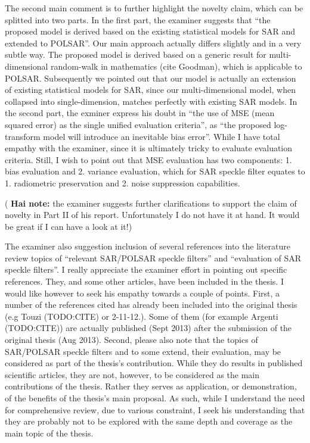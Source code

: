 \documentclass{article}
\begin{document}
The second main comment is to further highlight the novelty claim, which can be splitted into two parts.
In the first part, the examiner suggests that ``the proposed model is derived based on the existing statistical models for SAR and extended to POLSAR''.
Our main approach actually differs slightly and in a very subtle way.
The proposed model is derived based on a generic result for multi-dimensional random-walk in mathematics (cite Goodman), which is applicable to POLSAR.
Subsequently we pointed out that our model is actually an extension of existing statistical models for SAR,
  since our multi-dimensional model, when collapsed into single-dimension, matches perfectly with existing SAR models.
In the second part, the exminer express his doubt in ``the use of MSE (mean squared error) as the single unified evaluation criteria'',
  as ``the proposed log-transform model will introduce an inevitable bias error''.
While I have total empathy with the examiner, since it is ultimately tricky to evaluate evaluation criteria.
Still, I wish to point out that MSE evaluation has two components: 1. bias evaluation and 2. variance evaluation,
  which for SAR speckle filter equates to 1. radiometric preservation and 2. noise suppression capabilities.

( \textbf{ Hai note: }  the examiner suggests further clarifications to support the claim of novelty in Part II of his report.
Unfortunately I do not have it at hand.
It would be great if I can have a look at it!)

The examiner also suggestion inclusion of several references into the literature review topics of ``relevant SAR/POLSAR speckle filters'' and  ``evaluation of SAR speckle filters''.
I really appreciate the examiner effort in pointing out specific references.
They, and some other articles, have been included in the thesis.
I would like however to seek his empathy towards a couple of points.
First, a number of the references cited has already been included into the original thesis (e.g Touzi (TODO:CITE) or 2-11-12.). 
Some of them (for example Argenti (TODO:CITE)) are actually published (Sept 2013) after the submission of the original thesis (Aug 2013).
Second, please also note that the topics of SAR/POLSAR speckle filters and to some extend, their evaluation, may be considered as part of the thesis's contribution.
While they do results in published scientific articles, 
  they are not, however, to be considered as the main contributions of the thesis.
Rather they serves as application, or demonstration, of the benefits of the thesis's main proposal.
As such, while I understand the need for comprehensive review, due to various constraint, I seek his understanding that they are probably not to be explored with the same depth and coverage as the main topic of the thesis.
\end{document}
